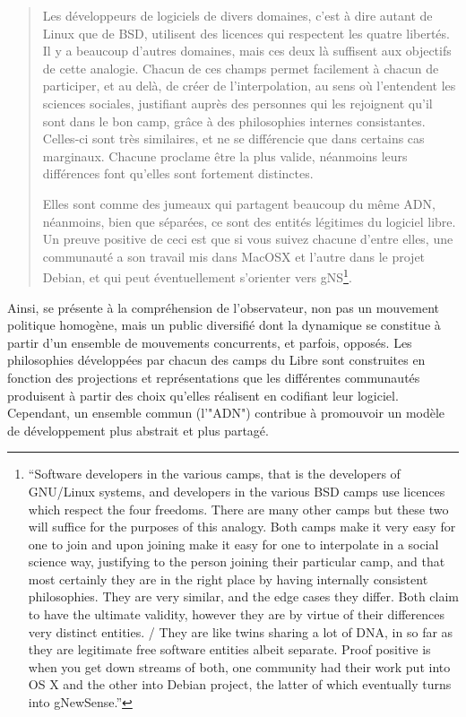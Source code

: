 \begin{quote}
Les développeurs de logiciels de divers domaines, c'est à dire autant de Linux que de BSD, utilisent des licences qui respectent les quatre libertés. Il y a beaucoup d'autres domaines, mais ces deux là suffisent aux objectifs de cette analogie. Chacun de ces champs permet facilement à chacun de participer, et au delà, de créer de l'interpolation, au sens où l'entendent les sciences sociales, justifiant auprès des personnes qui les rejoignent qu'il sont dans le bon camp, grâce à des philosophies internes consistantes. Celles-ci sont très similaires, et ne se différencie que dans certains cas marginaux. Chacune proclame être la plus valide, néanmoins leurs différences font qu'elles sont fortement distinctes.

Elles sont comme des jumeaux qui partagent beaucoup du même ADN, néanmoins, bien que séparées, ce sont des entités légitimes du logiciel libre. Un preuve positive de ceci est que si vous suivez chacune d'entre elles, une communauté a son travail mis dans MacOSX et l'autre dans le projet Debian, et qui peut éventuellement s'orienter vers gNS\footnote{“Software developers in the various camps, that is the developers of GNU/Linux systems, and developers in the various BSD camps use licences which respect the four freedoms. There are many other camps but these two will suffice for the purposes of this analogy. Both camps make it very easy for one to join and upon joining make it easy for one to interpolate in a social science way, justifying to the person joining their particular camp, and that most certainly they are in the right place by having internally consistent philosophies.  They are very similar, and the edge cases they differ. Both claim to have the ultimate validity, however they are by virtue of their differences very distinct entities. / They are like twins sharing a lot of DNA, in so far as they are legitimate free software entities albeit separate. Proof positive is when you get down streams of both, one community had their work put into OS X and the other into Debian project, the latter of which eventually turns into gNewSense.”}.
\end{quote}

Ainsi, se présente à la compréhension de l'observateur, non pas un mouvement politique homogène, mais un public diversifié dont la dynamique se constitue à partir d'un ensemble de mouvements concurrents, et parfois, opposés. Les philosophies développées par chacun des camps du Libre sont construites en fonction des projections et représentations que les différentes communautés produisent à partir des choix qu'elles réalisent en codifiant leur logiciel. Cependant, un ensemble commun (l'"ADN") contribue à promouvoir un modèle de développement plus abstrait et plus partagé.

